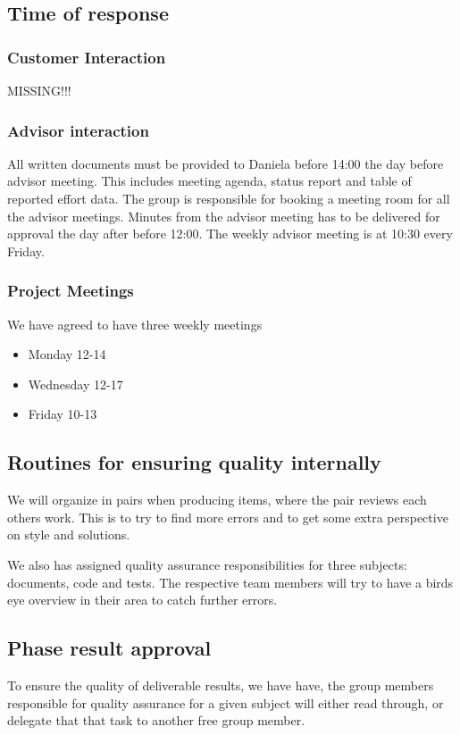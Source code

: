 \subsection{Time of response}

\subsubsection{Customer Interaction}
MISSING!!!

\subsubsection{Advisor interaction}
All written documents must be provided to Daniela before 14:00 the day before advisor meeting. This includes meeting agenda, status report and table of reported effort data. The group is responsible for booking a meeting room for all the advisor meetings. Minutes from the advisor meeting has to be delivered for approval the day after before 12:00. The weekly advisor meeting is at 10:30 every Friday. 

\subsubsection{Project Meetings}
We have agreed to have three weekly meetings
\begin{itemize}
	\item Monday 12-14
	\item Wednesday 12-17
	\item Friday 10-13
\end{itemize}

\subsection{Routines for ensuring quality internally}
We will organize in pairs when producing items, where the pair reviews each others work. This is to try to find more errors and to get some extra perspective on style and solutions.

We also has assigned quality assurance responsibilities for three subjects: documents, code and tests. The respective team members will try to have a birds eye overview in their area to catch further errors.

\subsection{Phase result approval}
To ensure the quality of deliverable results, we have have, the group members responsible for quality assurance for a given subject will either read through, or delegate that that task to another free group member.

